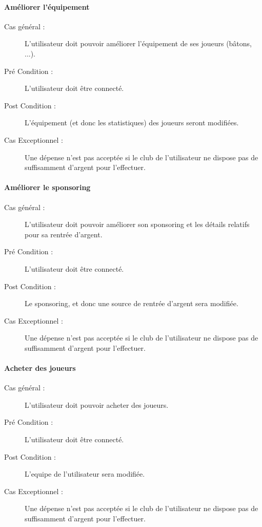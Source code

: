 \documentclass[a4paper]{article}
\begin{document}
\paragraph{Améliorer l'équipement}
\begin{description}
    \item[Cas général :] L'\gls{utilisateur} doit pouvoir améliorer l'équipement de ses \glspl{joueur} (bâtons, ...).
    \item[Pré Condition  :] L'\gls{utilisateur} doit être connecté.
    \item[Post Condition :] L'équipement (et donc les statistiques) des \glspl{joueur} seront modifiées.
    \item[Cas Exceptionnel :] Une dépense n'est pas acceptée si le \gls{club} de l'\gls{utilisateur} ne dispose pas de suffisamment d'argent pour l'effectuer.
\end{description}

\paragraph{Améliorer le sponsoring}
\begin{description}
\item[Cas général :] L'\gls{utilisateur} doit pouvoir améliorer son sponsoring et les détails relatifs pour sa rentrée d'argent.
\item[Pré Condition  :] L'\gls{utilisateur} doit être connecté.
\item[Post Condition :] Le sponsoring, et donc une source de rentrée d'argent sera modifiée.
\item[Cas Exceptionnel :] Une dépense n'est pas acceptée si le \gls{club} de l'\gls{utilisateur} ne dispose pas de suffisamment d'argent pour l'effectuer.
\end{description}

\paragraph{Acheter des \glspl{joueur}}
\begin{description}
    \item[Cas général :] L'\gls{utilisateur} doit pouvoir acheter des \glspl{joueur}.
    \item[Pré Condition  :] L'\gls{utilisateur} doit être connecté.
    \item[Post Condition :] L'\gls{equipe} de l'\gls{utilisateur} sera modifiée.
    \item[Cas Exceptionnel :] Une dépense n'est pas acceptée si le \gls{club} de l'\gls{utilisateur} ne dispose pas de suffisamment d'argent pour l'effectuer.
\end{description}
\end{document}
